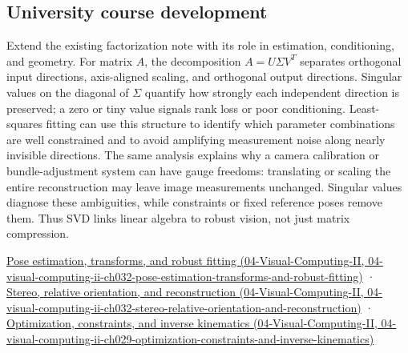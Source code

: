 \subsection{University course development}\label{appendix-1fad5e7f36fa-university-course-development}

Extend the existing factorization note with its role in estimation, conditioning, and geometry. For matrix \(A\), the decomposition \(A=U\Sigma V^T\) separates orthogonal input directions, axis-aligned scaling, and orthogonal output directions. Singular values on the diagonal of \(\Sigma\) quantify how strongly each independent direction is preserved; a zero or tiny value signals rank loss or poor conditioning. Least-squares fitting can use this structure to identify which parameter combinations are well constrained and to avoid amplifying measurement noise along nearly invisible directions. The same analysis explains why a camera calibration or bundle-adjustment system can have gauge freedoms: translating or scaling the entire reconstruction may leave image measurements unchanged. Singular values diagnose these ambiguities, while constraints or fixed reference poses remove them. Thus SVD links linear algebra to robust vision, not just matrix compression.

\href{../04-Visual-Computing-II/main.pdf\#nameddest=04-visual-computing-ii-ch032-pose-estimation-transforms-and-robust-fitting}{Pose estimation, transforms, and robust fitting (04-Visual-Computing-II, 04-visual-computing-ii-ch032-pose-estimation-transforms-and-robust-fitting)} · \href{../04-Visual-Computing-II/main.pdf\#nameddest=04-visual-computing-ii-ch032-stereo-relative-orientation-and-reconstruction}{Stereo, relative orientation, and reconstruction (04-Visual-Computing-II, 04-visual-computing-ii-ch032-stereo-relative-orientation-and-reconstruction)} · \href{../04-Visual-Computing-II/main.pdf\#nameddest=04-visual-computing-ii-ch029-optimization-constraints-and-inverse-kinematics}{Optimization, constraints, and inverse kinematics (04-Visual-Computing-II, 04-visual-computing-ii-ch029-optimization-constraints-and-inverse-kinematics)}
